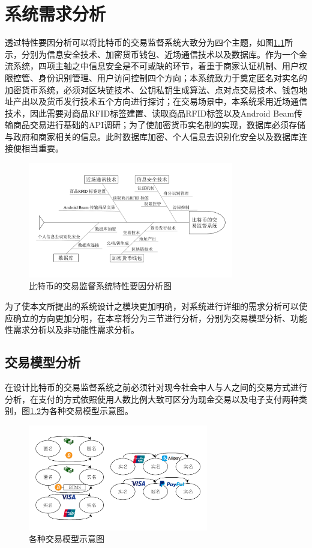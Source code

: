 \chapter{系统需求分析}

透过特性要因分析可以将比特币的交易监督系统大致分为四个主题，如图\ref{fish1}所示，分别为信息安全技术、加密货币钱包、近场通信技术以及数据库。作为⼀个⾦流系统，四项主轴之中信息安全是不可或缺的环节，着重于商家认证机制、用户权限控管、身份识别管理、用户访问控制四个方向；本系统致力于奠定匿名对实名的加密货币系统，必须对区块链技术、公钥私钥生成算法、点对点交易技术、钱包地址产出以及货币发行技术五个方向进行探讨；在交易场景中，本系统采用近场通信技术，因此需要对商品RFID标签建置、读取商品RFID标签以及Android Beam传输商品交易进行基础的API调研；为了使加密货币实名制的实现，数据库必须存储与政府和商家相关的信息。此时数据库加密、个人信息去识别化安全以及数据库连接便相当重要。
		\begin{figure}[!htb]
			\centering
			\includegraphics[width = 0.8\textwidth]{fish1.pdf}
			\caption{⽐特币的交易监督系统特性要因分析图}\label{fish1}
		\end{figure}

为了使本⽂所提出的系统设计之模块更加明确，对系统进⾏详细的需求分析可以使应确⽴的⽅向更加分明，在本章将分为三节进行分析，分别为交易模型分析、功能性需求分析以及非功能性需求分析。


\section{交易模型分析}

在设计比特币的交易监督系统之前必须针对现今社会中人与人之间的交易方式进行分析，在支付的方式依照使用人数比例大致可区分为现金交易以及电子支付两种类别，图\ref{modeall}为各种交易模型示意图。
\begin{figure}[!htb]
	\centering
	\includegraphics[width = 0.7\textwidth]{modeall.pdf}
	\caption{各种交易模型示意图}\label{modeall}
\end{figure}

